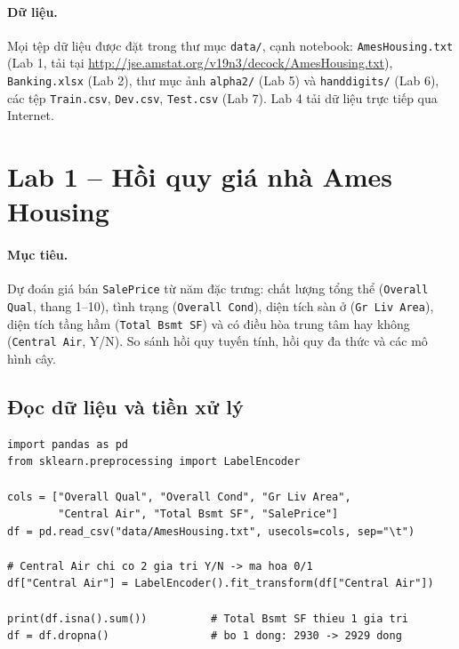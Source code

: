 \paragraph{Dữ liệu.} Mọi tệp dữ liệu được đặt trong thư mục \texttt{data/}, cạnh notebook: \texttt{AmesHousing.txt} (Lab 1, tải tại \url{http://jse.amstat.org/v19n3/decock/AmesHousing.txt}), \texttt{Banking.xlsx} (Lab 2), thư mục ảnh \texttt{alpha2/} (Lab 5) và \texttt{handdigits/} (Lab 6), các tệp \texttt{Train.csv}, \texttt{Dev.csv}, \texttt{Test.csv} (Lab 7). Lab 4 tải dữ liệu trực tiếp qua Internet.

\section{Lab 1 -- Hồi quy giá nhà Ames Housing}
\label{sec:lab-ames}

\paragraph{Mục tiêu.} Dự đoán giá bán \texttt{SalePrice} từ năm đặc trưng: chất lượng tổng thể (\texttt{Overall Qual}, thang 1--10), tình trạng (\texttt{Overall Cond}), diện tích sàn ở (\texttt{Gr Liv Area}), diện tích tầng hầm (\texttt{Total Bsmt SF}) và có điều hòa trung tâm hay không (\texttt{Central Air}, Y/N). So sánh hồi quy tuyến tính, hồi quy đa thức và các mô hình cây.

\subsection{Đọc dữ liệu và tiền xử lý}

\begin{lstlisting}[caption={Lab 1 -- đọc và tiền xử lý dữ liệu}]
import pandas as pd
from sklearn.preprocessing import LabelEncoder

cols = ["Overall Qual", "Overall Cond", "Gr Liv Area",
        "Central Air", "Total Bsmt SF", "SalePrice"]
df = pd.read_csv("data/AmesHousing.txt", usecols=cols, sep="\t")

# Central Air chi co 2 gia tri Y/N -> ma hoa 0/1
df["Central Air"] = LabelEncoder().fit_transform(df["Central Air"])

print(df.isna().sum())          # Total Bsmt SF thieu 1 gia tri
df = df.dropna()                # bo 1 dong: 2930 -> 2929 dong
\end{lstlisting}

